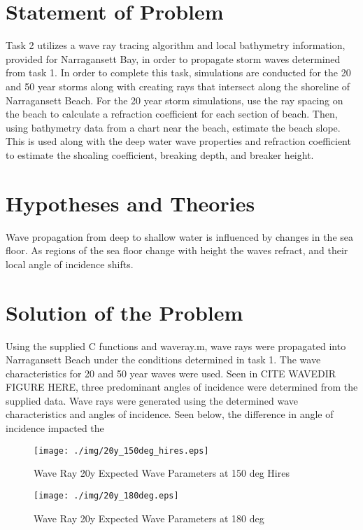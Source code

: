 \section{Statement of Problem}
Task 2 utilizes a wave ray tracing algorithm and local bathymetry information, provided for Narragansett Bay, in order to propagate storm waves determined from task 1. In order to complete this task, simulations are conducted for the 20 and 50 year storms along with creating rays that intersect along the shoreline of Narragansett Beach. For the 20 year storm simulations, use the ray spacing on the beach to calculate a refraction coefficient for each section of beach. Then, using bathymetry data from a chart near the beach, estimate the beach slope. This is used along with the deep water wave properties and refraction coefficient to estimate the shoaling coefficient, breaking depth, and breaker height. 
\section{Hypotheses and Theories}

Wave propagation from deep to shallow water is influenced by changes in the sea floor. As regions of the sea floor change with height the waves refract, and their local angle of incidence shifts. 

\section{Solution of the Problem}

Using the supplied C functions and waveray.m, wave rays were propagated into Narragansett Beach under the conditions determined in task 1. The wave characteristics for 20 and 50 year waves were used. Seen in CITE WAVEDIR FIGURE HERE, three predominant angles of incidence were determined from the supplied data. Wave rays were generated using the determined wave characteristics and angles of incidence. Seen below, the difference in angle of incidence impacted the 

\begin{figure}[H]
\centering
\texttt{[image: ./img/20y\_150deg\_hires.eps]}
\caption{Wave Ray 20y Expected Wave Parameters at 150 deg Hires}
\label{fig:prob4WHvWD}
\end{figure}

\begin{figure}[H]
\centering
\texttt{[image: ./img/20y\_180deg.eps]}
\caption{Wave Ray 20y Expected Wave Parameters at 180 deg}
\label{fig:prob4WHvWD}
\end{figure}

